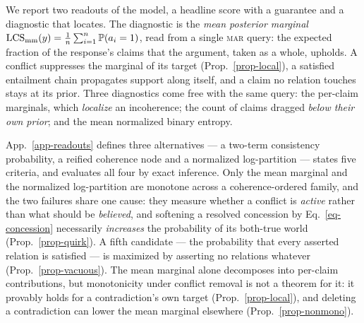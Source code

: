 We report two readouts of the model, a headline score with a guarantee and a diagnostic that
locates. The diagnostic is the \emph{mean posterior marginal} $\mathrm{LCS}_{\mathrm{mm}}(y) =
\tfrac{1}{n}\sum_{i=1}^{n}\mathbb{P}\!\left( a_i=1 \right)$, read from a single \textsc{mar} query: the expected fraction of the response's claims that the argument, taken as
a whole, upholds. A conflict suppresses the marginal of its target (Prop.~\ref{prop-local}), a satisfied entailment chain
propagates support along itself, and a claim no relation touches stays at its prior. Three diagnostics come free with the same query: the
per-claim marginals, which \emph{localize} an incoherence; the count of claims dragged \emph{below their own
prior}; and the mean normalized binary entropy.

App.~\ref{app-readouts} defines three alternatives --- a two-term consistency probability, a reified coherence
node and a normalized log-partition --- states five criteria, and evaluates all four by exact inference. Only
the mean marginal and the normalized log-partition are monotone across a coherence-ordered family, and the two failures
share one cause: they measure whether a conflict is \emph{active} rather than what should be \emph{believed},
and softening a resolved concession by Eq.~\ref{eq-concession} necessarily \emph{increases} the probability of
its both-true world (Prop.~\ref{prop-quirk}). A fifth candidate --- the probability that every asserted relation
is satisfied --- is maximized by asserting no relations whatever (Prop.~\ref{prop-vacuous}). The mean marginal
alone decomposes into per-claim contributions, but monotonicity under conflict removal is not a theorem for it: it
provably holds for a contradiction's own target (Prop.~\ref{prop-local}), and deleting a contradiction can lower the
mean marginal elsewhere (Prop.~\ref{prop-nonmono}).

